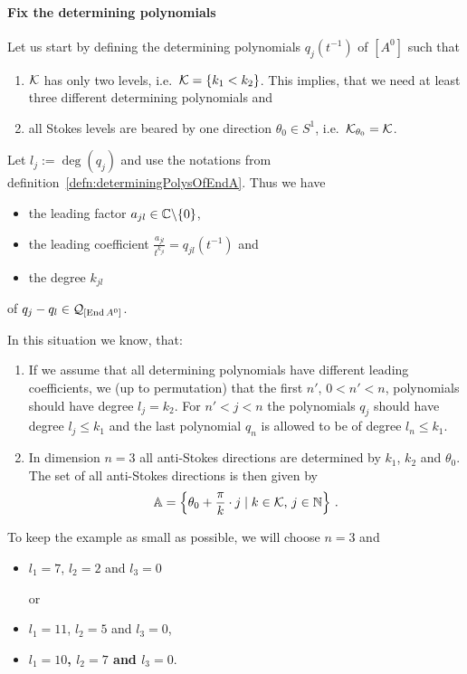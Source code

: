 \paragraph{Fix the determining polynomials}
Let us start by defining the determining polynomials $q_j(t^{-1})$ of $[A^0]$
such that
\begin{enumerate}
  \item $\mathcal{K}$ has only two levels, i.e.\  $\mathcal{K}=\{k_1<k_2\}$.
    This implies, that we need at least three different determining
    polynomials and
  \item all Stokes levels are beared by one direction $\theta_0\in S^1$,
    i.e.\ $\mathcal{K}_{\theta_0}=\mathcal{K}$.
\end{enumerate}
Let $l_j:=\deg(q_j)$ and use the notations from
definition~\ref{defn:determiningPolysOfEndA}. Thus we have
\begin{itemize}
  \item the leading factor $a_{jl}\in\mathbb{C}\backslash\{0\}$,
  \item the leading coefficient $\frac{a_{jl}}{t^{k_{jl}}}=q_{jl}(t^{-1})$ and
  \item the degree $k_{jl}$
\end{itemize}
of $q_j-q_l\in\mathcal{Q}_{[\operatorname{End} A^0]}$.
\begin{rem}
  In this situation we know, that:
  \begin{enumerate}
    \item
      If we assume that all determining polynomials have different leading
      coefficients, we  (up to permutation) that the first
      $n'$, $0<n'<n$, polynomials should have degree $l_j=k_2$.
      For $n'<j<n$ the polynomials $q_j$ should have degree $l_j\leq k_1$ and
      the last polynomial $q_n$ is allowed to be of degree $l_n\leq k_1$.
    \item In dimension $n=3$
      all anti-Stokes directions are determined by $k_1$, $k_2$ and $\theta_0$.
      The set of all anti-Stokes directions is then given by
      \[
        \mathbb{A}=\left\{
            \theta_0+\frac{\pi}{k}\cdot j\mid k\in\mathcal{K}\text{, } j\in\mathbb{N}
          \right\}\,.
      \]
  \end{enumerate}
\end{rem}
To keep the example as small as possible, we will choose $n=3$ and
\begin{itemize}
  \item $l_1=7$, $l_2=2$ and $l_3=0$
    \begin{comment}
      In the $\cK=\{2,7\}$ case is
      \[
        \cU^{k_2}=\cU^{\leq k_2}=\cU^{\leq k_1}
      \]
    \end{comment}
    or
  \item $l_1=11$, $l_2=5$ and $l_3=0$,
  \item \textbf{\boldmath$l_1=10$, $l_2=7$ and $l_3=0$}.
\end{itemize}
